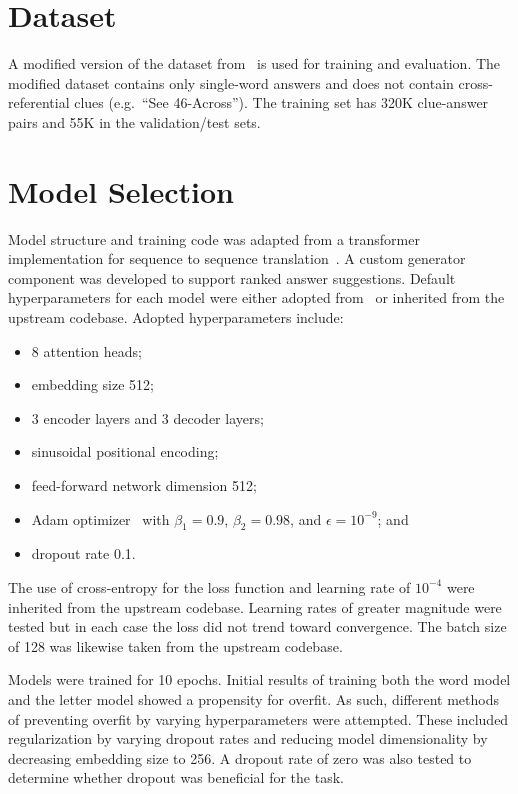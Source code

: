 \documentclass[letterpaper]{article} %
\begin{document}
\begin{NoHyper}
\section{Dataset}
\label{sec:dataset}

A modified version of the dataset from~\citeauthor{kulshreshtha2022across} is used for training and evaluation.
The modified dataset contains only single-word answers and does not contain cross-referential clues (e.g.~``See 46-Across'').
The training set has 320K clue-answer pairs and 55K in the validation/test sets.

\section{Model Selection}
\label{sec:model}

Model structure and training code was adapted from a transformer implementation for sequence to sequence translation~\cite{chegde2022}.
A custom generator component was developed to support ranked answer suggestions.
Default hyperparameters for each model were either adopted from~\citeauthor{vaswani2017} or inherited from the upstream codebase.
Adopted hyperparameters include:

\begin{itemize}
\item 8 attention heads;
\item embedding size 512;
\item 3 encoder layers and 3 decoder layers;
\item sinusoidal positional encoding;
\item feed-forward network dimension 512;
\item Adam optimizer~\cite{kingma2017adam} with $\beta_1 = 0.9$, $\beta_2 = 0.98$, and $\epsilon = 10^{-9}$; and
\item dropout rate 0.1.
\end{itemize}

The use of cross-entropy for the loss function and learning rate of $10^{-4}$ were inherited from the upstream codebase.
Learning rates of greater magnitude were tested but in each case the loss did not trend toward convergence.
The batch size of 128 was likewise taken from the upstream codebase.

Models were trained for 10 epochs.
Initial results of training both the word model and the letter model showed a propensity for overfit.
As such, different methods of preventing overfit by varying hyperparameters were attempted.
These included regularization by varying dropout rates and reducing model dimensionality by decreasing embedding size to 256.
A dropout rate of zero was also tested to determine whether dropout was beneficial for the task.


\end{NoHyper}
\end{document}
